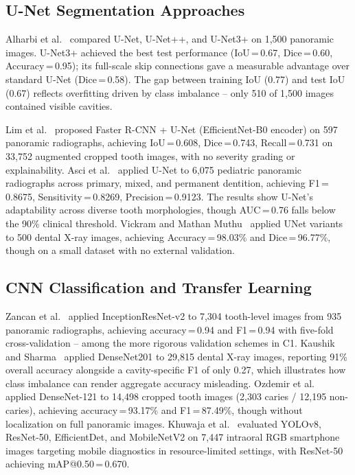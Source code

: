 \documentclass[conference]{IEEEtran}
\begin{document}
\subsection{U-Net Segmentation Approaches}

Alharbi et al.~\cite{alharbi2023detection} compared U-Net, U-Net++, and
U-Net3+ on 1,500 panoramic images. U-Net3+ achieved the best test
performance (IoU\,=\,0.67, Dice\,=\,0.60, Accuracy\,=\,0.95); its
full-scale skip connections gave a measurable advantage over standard
U-Net (Dice\,=\,0.58). The gap between training IoU (0.77) and test IoU
(0.67) reflects overfitting driven by class imbalance -- only 510 of
1,500 images contained visible cavities.

Lim et al.~\cite{lim2024dual} proposed Faster R-CNN + U-Net
(EfficientNet-B0 encoder) on 597 panoramic radiographs, achieving
IoU\,=\,0.608, Dice\,=\,0.743, Recall\,=\,0.731 on 33,752 augmented
cropped tooth images, with no severity grading or explainability.
Asci et al.~\cite{asci2024deep} applied U-Net to 6,075 pediatric
panoramic radiographs across primary, mixed, and permanent
dentition, achieving F1\,=\,0.8675, Sensitivity\,=\,0.8269,
Precision\,=\,0.9123. The results show U-Net's adaptability across
diverse tooth morphologies, though AUC\,=\,0.76 falls below the 90\%
clinical threshold. Vickram and Mathan Muthu~\cite{vickram2025extraction}
applied UNet variants to 500 dental X-ray images, achieving
Accuracy\,=\,98.03\% and Dice\,=\,96.77\%, though on a small dataset
with no external validation.


\subsection{CNN Classification and Transfer Learning}

Zancan et al.~\cite{zancan2025ai} applied InceptionResNet-v2 to 7,304
tooth-level images from 935 panoramic radiographs, achieving
accuracy\,=\,0.94 and F1\,=\,0.94 with five-fold cross-validation --
among the more rigorous validation schemes in C1. Kaushik and
Sharma~\cite{kaushik2025densenet201} applied DenseNet201 to 29,815
dental X-ray images, reporting 91\% overall accuracy alongside a
cavity-specific F1 of only 0.27, which illustrates how class imbalance
can render aggregate accuracy misleading. Ozdemir et al.~\cite{ozdemir2026enhanced}
applied DenseNet-121 to 14,498 cropped tooth images (2,303 caries /
12,195 non-caries), achieving accuracy\,=\,93.17\% and F1\,=\,87.49\%,
though without localization on full panoramic images. Khuwaja et
al.~\cite{khuwaja2024ai} evaluated YOLOv8, ResNet-50, EfficientDet, and
MobileNetV2 on 7,447 intraoral RGB smartphone images targeting mobile
diagnostics in resource-limited settings, with ResNet-50 achieving
mAP@0.50\,=\,0.670.
\end{document}
